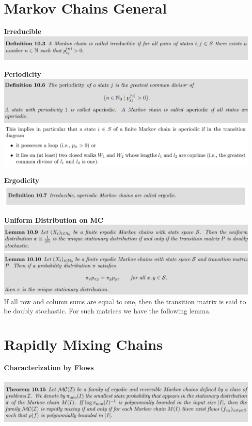 \documentclass[25pt]{sciposter}
\begin{document}
\begin{multicols}{3}
\section{Markov Chains General}

\textbf{Irreducible}\\
\includegraphics[width=\linewidth]{screenshot011}

\textbf{Periodicity}\\
\includegraphics[width=\linewidth]{screenshot012}
\includegraphics[width=\linewidth]{screenshot013}

\textbf{Ergodicity}\\
\includegraphics[width=\linewidth]{screenshot014}


\textbf{Uniform Distribution on MC}\\
\includegraphics[width=\linewidth]{screenshot015}
\includegraphics[width=\linewidth]{screenshot016}
If all row and column sums are equal to one, then the transition matrix is said to be doubly stochastic. For such matrices we have the following lemma.



\section{Rapidly Mixing Chains}
\textbf{Characterization by Flows}\\\\
\includegraphics[width=\linewidth]{screenshot019}


\end{multicols}
\end{document}
